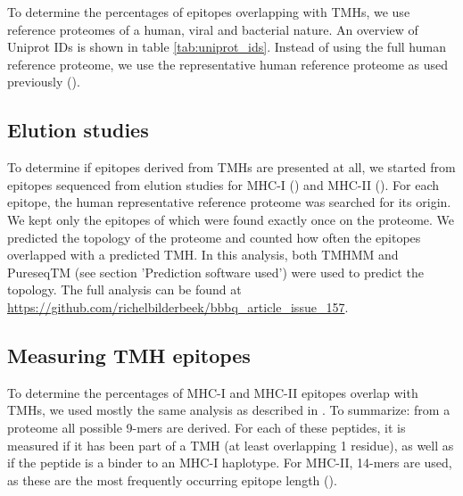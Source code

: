 
To determine the percentages of epitopes overlapping
with TMHs, we use reference proteomes of 
a human, viral and bacterial nature.
An overview of Uniprot IDs is shown in table \ref{tab:uniprot_ids}.
Instead of using the full human reference proteome, we
use the representative human reference proteome 
as used previously (\cite{bianchi2017}).


\subsection{Elution studies}\label{subsec:elution_studies}

To determine if epitopes derived from TMHs are presented at all,
we started from epitopes sequenced from elution studies
for MHC-I (\cite{schellens2015comprehensive}) 
and MHC-II (\cite{bergseng2015different}).
For each epitope, the human representative reference proteome
was searched for its origin.
We kept only the epitopes of which were found exactly once
on the proteome.
We predicted the topology of the proteome
and counted how often the epitopes overlapped
with a predicted TMH.
In this analysis, both TMHMM and 
PureseqTM (see section 'Prediction software used') 
were used to predict the topology.
The full analysis can be found
at \url{https://github.com/richelbilderbeek/bbbq_article_issue_157}.

\subsection{Measuring TMH epitopes}

To determine the percentages of MHC-I and MHC-II epitopes overlap
with TMHs, we used mostly the same analysis as described in \cite{bianchi2017}.
To summarize: from a proteome all possible 9-mers are derived. For each
of these peptides, it is measured if it has been part of a 
TMH (at least overlapping 1 residue), 
as well as if the peptide is a binder to an MHC-I haplotype.
For MHC-II, 14-mers are used, as these are the most frequently occurring
epitope length (\cite{bergseng2015different}).

